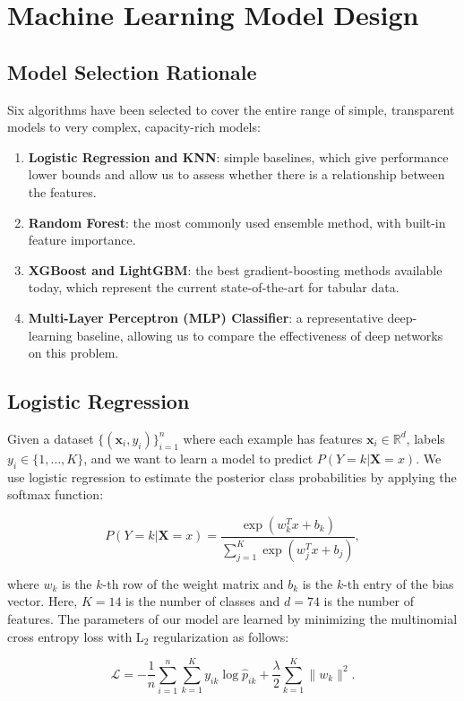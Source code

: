 \section{Machine Learning Model Design}

\subsection{Model Selection Rationale}

Six algorithms have been selected to cover the entire range of simple, transparent models to very complex, capacity-rich models:
\begin{enumerate}
\item \textbf{Logistic Regression and KNN}: simple baselines, which give performance lower bounds and allow us to assess whether there is a relationship between the features.
\item \textbf{Random Forest}: the most commonly used ensemble method, with built-in feature importance.
\item \textbf{XGBoost and LightGBM}: the best gradient-boosting methods available today, which represent the current state-of-the-art for tabular data.
\item \textbf{Multi-Layer Perceptron (MLP) Classifier}: a representative deep-learning baseline, allowing us to compare the effectiveness of deep networks on this problem.
\end{enumerate}
\subsection{Logistic Regression}

Given a dataset $\{(\boldsymbol{x}_i,y_i)\}_{i=1}^{n}$ where each example has features $\boldsymbol{x}_i \in \mathbb{R}^d$, labels $y_i \in \{1, \ldots, K\}$, and we want to learn a model to predict $P(Y=k|\boldsymbol{X}=x)$. We use logistic regression to estimate the posterior class probabilities by applying the softmax function:

$$P(Y=k|\boldsymbol{X}=x)=\frac{\exp(w_k^T x+b_k)}{\sum_{j=1}^K \exp(w_j^T x+ b_j)},$$

where $w_k$ is the $k$-th row of the weight matrix and $b_k$ is the $k$-th entry of the bias vector. Here, $K=14$ is the number of classes and $d=74$ is the number of features. The parameters of our model are learned by minimizing the multinomial cross entropy loss with L$_2$ regularization as follows:

$$\mathcal{L}=-\frac{1}{n}\displaystyle\sum_{i=1}^n\sum_{k=1}^Ky_{ik}\log\hat p_{ik}+\frac{\lambda}{2}\sum_{k=1}^K\lVert w_k\rVert^2.$$

